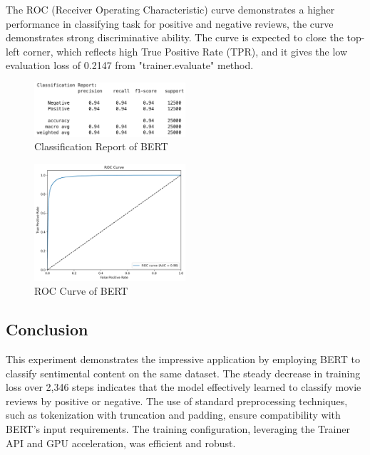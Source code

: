 The ROC (Receiver Operating Characteristic) curve demonstrates a higher performance in classifying task for positive and negative reviews, the curve demonstrates strong discriminative ability. The curve is expected to close the top-left corner, which reflects high True Positive Rate (TPR), and it gives the low evaluation loss of 0.2147 from "trainer.evaluate" method. 

\begin{figure}[ht]
    \centering
    \includegraphics[width=0.5\textwidth]{pics/bert_eval_report.png}
    \caption{Classification Report of BERT}
\end{figure}

\begin{figure}[ht]
    \centering
    \includegraphics[width=0.5\textwidth]{pics/bert_roc_curve.png}
    \caption{ROC Curve of BERT}
\end{figure}

\subsection{Conclusion}

This experiment demonstrates the impressive application by employing BERT to classify sentimental content on the same dataset. The steady decrease in training loss over 2,346 steps indicates that the model effectively learned to classify movie reviews by positive or negative. The use of standard preprocessing techniques, such as tokenization with truncation and padding, ensure compatibility with BERT's input requirements. The training configuration, leveraging the Trainer API and GPU acceleration, was efficient and robust.